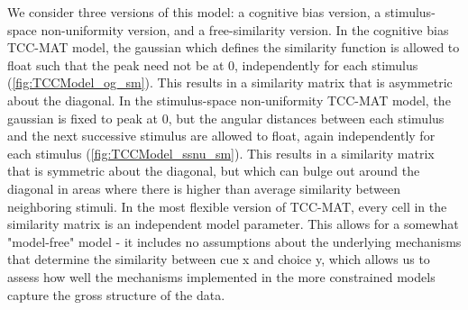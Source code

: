 We consider three versions of this model: a cognitive bias version, a stimulus-space non-uniformity version, and a free-similarity version.
In the cognitive bias TCC-MAT model, the gaussian which defines the similarity function is allowed to float such that the peak need not be at 0, independently for each stimulus (\autoref{fig:TCCModel_og_sm}).
This results in a similarity matrix that is asymmetric about the diagonal.
In the stimulus-space non-uniformity TCC-MAT model, the gaussian is fixed to peak at 0, but the angular distances between each stimulus and the next successive stimulus are allowed to float, again independently for each stimulus (\autoref{fig:TCCModel_ssnu_sm}).
This results in a similarity matrix that is symmetric about the diagonal, but which can bulge out around the diagonal in areas where there is higher than average similarity between neighboring stimuli.
In the most flexible version of TCC-MAT, every cell in the similarity matrix is an independent model parameter.
This allows for a somewhat "model-free" model - it includes no assumptions about the underlying mechanisms that determine the similarity between cue x and choice y, which allows us to assess how well the mechanisms implemented in the more constrained models capture the gross structure of the data.

